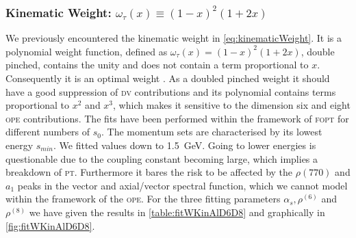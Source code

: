 \documentclass[../../index.tex]{subfiles}
\begin{document}
\subsubsection{Kinematic Weight: \(\omega_{\tau}(x) \equiv (1-x)^2(1+2x)\)}
We previously encountered the kinematic weight in \cref{eq:kinematicWeight}. It
is a polynomial weight function, defined as \(\omega_\tau(x) = (1-x)^2(1+2x)\),
double pinched, contains the unity and does not contain a term proportional to
\(x\). Consequently it is an optimal weight \cite{Beneke2012}. As a doubled
pinched weight it should have a good suppression of \textsc{dv} contributions
and its polynomial contains terms proportional to \(x^2\) and \(x^3\), which
makes it sensitive to the dimension six and eight \textsc{ope} contributions.
The fits have been performed within the framework of \textsc{fopt} for different
numbers of \(s_0\). The momentum sets are characterised by its lowest energy
\(s_{min}\). We fitted values down to \SI{1.5}{\giga\eV}. Going to lower
energies is questionable due to the coupling constant becoming large, which
implies a breakdown of \textsc{pt}. Furthermore it bares the risk to be affected
by the \(\rho(770)\) and \(a_1\) peaks in the vector and axial\-/vector spectral
function, which we cannot model within the framework of the \textsc{ope}. For
the three fitting parameters \(\alpha_s, \rho^{(6)}\) and \(\rho^{(8)}\) we have
given the results in \cref{table:fitWKinAlD6D8} and graphically in
\cref{fig:fitWKinAlD6D8}.
\end{document}
